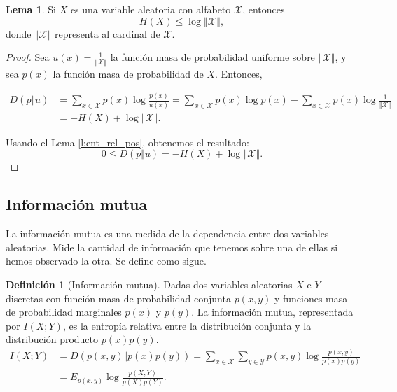 \documentclass[10pt,a4paper]{article} %
\theoremstyle{definition}
\newtheorem{definition}{Definición}[section]
\newtheorem{lemma}[theorem]{Lema}
\begin{document}
\begin{lemma}
  Si $X$ es una variable aleatoria con alfabeto $\mathcal{X}$, entonces \[
  H(X) \leq \log{\left\Vert\mathcal{X}\right\Vert}, 
  \]
donde $\left\Vert\mathcal{X}\right\Vert$ representa al cardinal de $\mathcal{X}$.
\end{lemma}
\begin{proof}
  Sea $u(x) = \frac{1}{\left\Vert\mathcal{X}\right\Vert}$ la función masa de probabilidad uniforme sobre $\left\Vert\mathcal{X}\right\Vert$, y sea $p(x)$ la función masa de probabilidad de $X$. Entonces,
  
 \begin{align*}
   D \left ( p \Vert u \right ) &= \sum_{x \in \mathcal{X}}
   p(x) \log \frac{p(x)}{u(x)} = \sum_{x \in \mathcal{X}} p(x) \log p(x) - \sum_{x \in \mathcal{X}} p(x) \log \frac{1}{\left\Vert\mathcal{X}\right\Vert}\\
  &= -H(X) + \log \left\Vert\mathcal{X}\right\Vert.
 \end{align*}
 
    Usando el Lema \ref{l:ent_rel_pos}, obtenemos el resultado: \[
0 \leq D\left ( p \Vert u \right ) = -H(X) + \log \left\Vert\mathcal{X}\right\Vert.
    \]
\end{proof}

\subsection{Información mutua}

La información mutua es una medida de la dependencia entre dos variables aleatorias. Mide la cantidad de información que tenemos sobre una de ellas si hemos observado la otra. Se define como sigue.

\begin{definition}[Información mutua]
  Dadas dos variables aleatorias $X$ e $Y$ discretas con función masa de probabilidad conjunta $p(x,y)$ y funciones masa de probabilidad marginales $p(x)$ y $p(y)$. La información mutua, representada por $I(X;Y)$, es la entropía relativa entre la distribución conjunta y la distribución producto $p(x)p(y)$.
  \begin{align*}
  I(X;Y) &= D \left ( p(x,y) \Vert p(x)p(y) \right ) = \sum_{x \in \mathcal{X}}\sum_{y \in \mathcal{Y}} p(x,y) \log \frac{p(x,y)}{p(x)p(y)}\\ &= E_{p(x,y)} \log \frac{p(X,Y)}{p(X)p(Y)}.
  \end{align*}
\end{definition}
\end{document}
